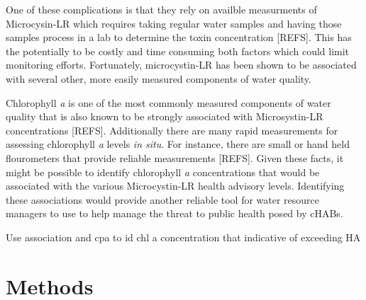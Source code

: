 \documentclass[11pt,]{article}
\begin{document}
One of these complications is that they rely on availble measurments of
Microcysin-LR which requires taking regular water samples and having
those samples process in a lab to determine the toxin concentration
{[}REFS{]}. This has the potentially to be costly and time consuming
both factors which could limit monitoring efforts. Fortunately,
microcystin-LR has been shown to be associated with several other, more
easily measured components of water quality.

Chlorophyll \emph{a} is one of the most commonly measured components of
water quality that is also known to be strongly associated with
Microsystin-LR concentrations {[}REFS{]}. Additionally there are many
rapid measurements for assessing chlorophyll \emph{a} levels \emph{in
situ}. For instance, there are small or hand held flourometers that
provide reliable measurements {[}REFS{]}. Given these facts, it might be
possible to identify chlorophyll \emph{a} concentrations that would be
associated with the various Microcystin-LR health advisory levels.
Identifying these associations would provide another reliable tool for
water resource managers to use to help manage the threat to public
health posed by cHABs.

Use association and cpa to id chl a concentration that indicative of
exceeding HA

\section{Methods}\label{methods}
\end{document}
